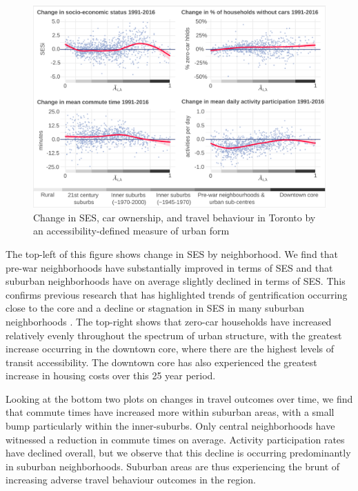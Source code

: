 \begin{figure}[H]
	\centering
	\vspace{2mm}
	\hspace*{-0.333in}
	\includegraphics[width=6.5in]{figures/Fig4_sub_plot_4.png}
	\caption{{Change in SES, car ownership, and travel behaviour in Toronto by an accessibility-defined measure of urban form}}
	\label{fig:sub_pov}
\end{figure}

The top-left of this figure shows change in SES by neighborhood. We find that pre-war neighborhoods have substantially improved in terms of SES and that suburban neighborhoods have on average slightly declined in terms of SES. This confirms previous research that has highlighted trends of gentrification occurring close to the core and a decline or stagnation in SES in many suburban neighborhoods \cite{ades_are_2012,hulchanski_three_2010,walks_social_2001,ades_is_2016}. The top-right shows that zero-car households have increased relatively evenly throughout the spectrum of urban structure, with the greatest increase occurring in the downtown core, where there are the highest levels of transit accessibility. The downtown core has also experienced the greatest increase in housing costs over this 25 year period.

Looking at the bottom two plots on changes in travel outcomes over time, we find that commute times have increased more within suburban areas, with a small bump particularly within the inner-suburbs. Only central neighborhoods have witnessed a reduction in commute times on average. Activity participation rates have declined overall, but we observe that this decline is occurring predominantly in suburban neighborhoods. Suburban areas are thus experiencing the brunt of increasing adverse travel behaviour outcomes in the region.

